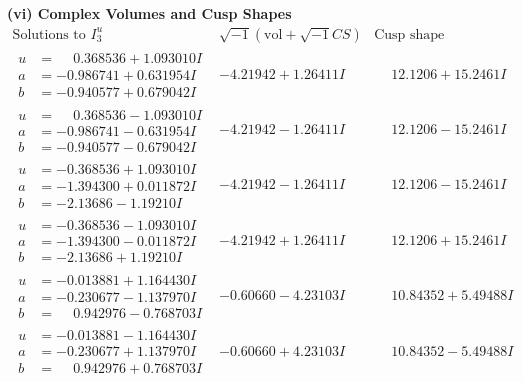 \documentclass[1p]{elsarticle_modified}
\theoremstyle{definition}
\newcommand{\I}{\sqrt{-1}}
\begin{document}
\newpage\flushleft \textbf{(vi) Complex Volumes and Cusp Shapes}
$$\begin{array}{c|c|c}  
\text{Solutions to }I^u_{3}& \I (\text{vol} + \sqrt{-1}CS) & \text{Cusp shape}\\
 \hline 
\begin{aligned}
u &= \phantom{-}0.368536 + 1.093010 I \\
a &= -0.986741 + 0.631954 I \\
b &= -0.940577 + 0.679042 I\end{aligned}
 & -4.21942 + 1.26411 I & \phantom{-}12.1206 + 15.2461 I \\ \hline\begin{aligned}
u &= \phantom{-}0.368536 - 1.093010 I \\
a &= -0.986741 - 0.631954 I \\
b &= -0.940577 - 0.679042 I\end{aligned}
 & -4.21942 - 1.26411 I & \phantom{-}12.1206 - 15.2461 I \\ \hline\begin{aligned}
u &= -0.368536 + 1.093010 I \\
a &= -1.394300 + 0.011872 I \\
b &= -2.13686 - 1.19210 I\end{aligned}
 & -4.21942 - 1.26411 I & \phantom{-}12.1206 - 15.2461 I \\ \hline\begin{aligned}
u &= -0.368536 - 1.093010 I \\
a &= -1.394300 - 0.011872 I \\
b &= -2.13686 + 1.19210 I\end{aligned}
 & -4.21942 + 1.26411 I & \phantom{-}12.1206 + 15.2461 I \\ \hline\begin{aligned}
u &= -0.013881 + 1.164430 I \\
a &= -0.230677 - 1.137970 I \\
b &= \phantom{-}0.942976 - 0.768703 I\end{aligned}
 & -0.60660 - 4.23103 I & \phantom{-}10.84352 + 5.49488 I \\ \hline\begin{aligned}
u &= -0.013881 - 1.164430 I \\
a &= -0.230677 + 1.137970 I \\
b &= \phantom{-}0.942976 + 0.768703 I\end{aligned}
 & -0.60660 + 4.23103 I & \phantom{-}10.84352 - 5.49488 I \\ \hline\begin{aligned}

\end{aligned}
\end{array}$$
\end{document}
